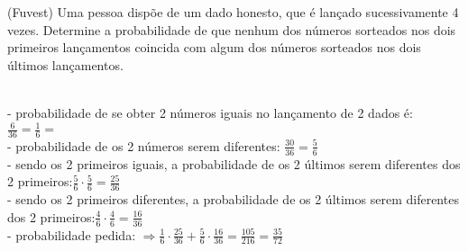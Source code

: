 \begin{ex}
 (Fuvest) Uma pessoa dispõe de um dado honesto, que é lançado sucessivamente 4 vezes. Determine a probabilidade de que nenhum dos números sorteados nos dois primeiros lançamentos coincida com algum dos números sorteados nos dois últimos lançamentos.

  \begin{sol}
  \phantom{A}  \\
  - probabilidade de se obter  2 números  iguais no lançamento de 2 dados é: \hspace{0,3cm}$\frac{6}{36}=\frac{1}{6}=$\\
  - probabilidade de os 2 números serem diferentes:\hspace{0,3cm} $\frac{30}{36}=\frac{5}{6}$\\
  - sendo os 2 primeiros iguais, a probabilidade de os 2 últimos serem diferentes dos 2 primeiros:\hspace{0,3cm}$\frac{5}{6}\cdot\frac{5}{6}=\frac{25}{36}$ \\
  - sendo os 2 primeiros diferentes, a probabilidade de os 2 últimos serem diferentes dos 2 primeiros:\hspace{0,3cm}$\frac{4}{6}\cdot\frac{4}{6}=\frac{16}{36}$ \\
  - probabilidade pedida: $\Longrightarrow\frac{1}{6}\cdot\frac{25}{36}+\frac{5}{6}\cdot\frac{16}{36}=\frac{105}{216}=\frac{35}{72}$
  \end{sol}
\end{ex}